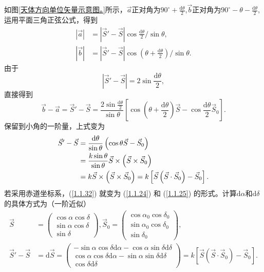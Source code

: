 \documentclass[11pt, a4paper, oneside]{ctexart}
\numberwithin{equation}{subsection}
\begin{document}
如图\ref{天体方向单位矢量示意图。}所示，$\vec{a}$正对角为$90^{\circ}+\frac{\mathrm{d}\theta}{2}$,$\vec{b}$正对角为$90^{\circ}-\theta-\frac{\mathrm{d}\theta}{2}$,运用平面三角正弦公式，得到
\begin{align}
\left\vert{}\vec a\right\vert{}&=\left\vert{}\vec S'-\vec S\right\vert{}\cos\frac{\mathrm{d}\theta}{2}/\sin\theta,\\
\left\vert{}\vec b\right\vert{}&=\left\vert{}\vec S'-\vec S\right\vert{}\cos\left(\theta+\frac{\mathrm{d}\theta}{2}\right)/\sin\theta.
\end{align}
由于
\begin{equation}
\left\vert{}\vec S'-\vec S\right\vert{}=2\sin\frac{\mathrm{d}\theta}{2},
\end{equation}
直接得到
\begin{equation}
\vec{b}-\vec{a}=\vec{S}'-\vec{S}=\frac{2\sin\frac{\mathrm{d}\theta}{2}}{\sin\theta}\left[\cos\left(\theta+\frac{\mathrm{d}\theta}{2}\right)\vec{S}-\cos\frac{\mathrm{d}\theta}{2}\vec{S}_{0}\right].
\end{equation}
保留到小角的一阶量，上式变为
\begin{align}
\vec{S}'-\vec{S}&=\frac{\mathrm{d}\theta}{\sin\theta}\left(\cos\theta\vec{S}-\vec{S}_{0}\right)\notag\\
&=\frac{k\sin\theta}{\sin\theta}\vec{S}\times\left(\vec{S}\times\vec{S}_{0}\right)\notag\\
&=k\vec{S}\times\left(\vec{S}\times\vec{S}_{0}\right)=k\left[\vec{S}\left(\vec{S}\cdot\vec{S}_{0}\right)-\vec{S}_{0}\right].\label{1.1.32}
\end{align}
若采用赤道坐标系，(\ref{1.1.32}) 就变为 (\ref{1.1.24}) 和 (\ref{1.1.25}) 的形式。计算$\mathrm{d}\alpha$和$\mathrm{d}\delta{}$的具体方式为（一阶近似）
\begin{align}
\vec S&=\begin{pmatrix}
\cos\alpha\cos\delta\\
\sin\alpha\cos\delta\\
\sin\delta
\end{pmatrix},
\vec S_{0}=\begin{pmatrix}
\cos\alpha_{0}\cos\delta_{0}\\
\sin\alpha_{0}\cos\delta_{0}\\
\sin\delta_{0}
\end{pmatrix},\\
\vec S'-\vec S&=\mathrm{d}\vec S=\begin{pmatrix}
-\sin\alpha\cos\delta\mathrm{d}\alpha-\cos\alpha\sin\delta\mathrm{d}\delta\\
\cos\alpha\cos\delta\mathrm{d}\alpha-\sin\alpha\sin\delta\mathrm{d}\delta\\
\cos\delta\mathrm{d}\delta
\end{pmatrix}=k\left[\vec{S}\left(\vec{S}\cdot\vec{S}_{0}\right)-\vec{S}_{0}\right].
\end{align}
\end{document}
